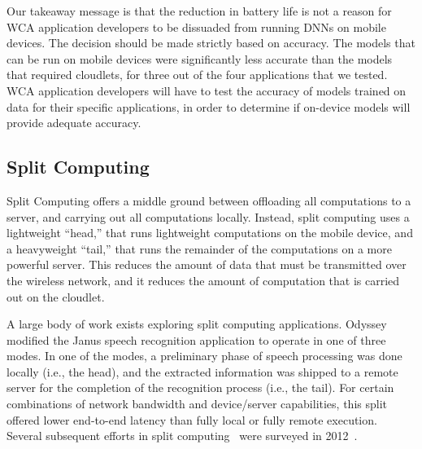Our takeaway message is that the reduction in battery life is not a reason for
WCA application developers to be dissuaded from running DNNs on mobile
devices.
The decision should be made strictly based on accuracy.
The models that can be run on mobile devices were significantly less
accurate than the models that required cloudlets, for three out of the four
applications that we tested.
WCA application developers will have to test the accuracy of models trained
on data for their specific applications, in order to determine if on-device
models will provide adequate accuracy.

\subsection{Split Computing}\label{sec:split_computing}

Split Computing offers a middle ground between offloading all computations to a
server, and carrying out all computations locally.
Instead, split computing uses a lightweight ``head,'' that runs lightweight
computations on the mobile device, and a heavyweight ``tail,'' that runs the
remainder of the computations on a more powerful server.
This reduces the amount of data that must be transmitted over the wireless
network, and it reduces the amount of computation that is carried out on the
cloudlet.

A large body of work exists exploring split computing applications.
Odyssey~\cite{Noble1997} modified the Janus speech recognition application to
operate in one of three modes.
In one of the modes, a preliminary phase of speech
processing was done locally (i.e., the head), and the extracted
information was shipped to a remote server for the completion of the
recognition process (i.e., the tail).
For certain combinations of
network bandwidth and device/server capabilities, this split offered
lower end-to-end latency than fully local or fully remote execution.
Several subsequent efforts in split computing~\cite{Balan2002, Flinn2001,
  Flinn2003b, Narayanan2003, Goyal2004, Su2005, Ok2007, Balan2007,
  Kristensen2008} were surveyed in 2012~\cite{Flinn2012}.

